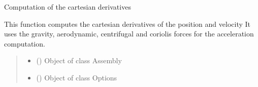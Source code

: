 \documentclass[letterpaper,10pt,english]{sphinxmanual}
\begin{document}

\begin{fulllineitems}
\label{\detokenize{modules:dynamics.compute_cartesian_derivatives}}
\pysigstartsignatures
{}
\pysigstopsignatures
\sphinxAtStartPar
Computation of the cartesian derivatives

\sphinxAtStartPar
This function computes the cartesian derivatives of the position and velocity
It uses the gravity, aerodynamic, centrifugal and coriolis forces for the acceleration computation.
\begin{quote}\begin{description}
\begin{itemize}
\item {} 
\sphinxAtStartPar
{} ({\hyperref[\detokenize{modules:assembly.Assembly}]{}}) \textendash{} Object of class Assembly

\item {} 
\sphinxAtStartPar
{} ({\hyperref[\detokenize{modules:configuration.Options}]{}}) \textendash{} Object of class Options

\end{itemize}

\end{description}\end{quote}

\end{fulllineitems}

\end{document}
